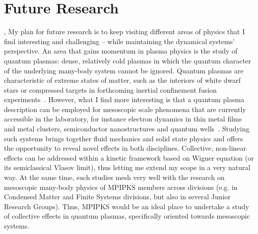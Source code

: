 \documentclass[11pt,a4paper,final]{moderncv}
\begin{document}
\section{Future Research}
\sep
{}
My plan for future research is to keep visiting different areas of
physics that I find interesting and challenging -- while maintaining 
the dynamical systems' perspective. An area that gains momentum
in plasma physics is the study of quantum plasmas: dense, relatively cold
plasmas in which the quantum 
character of the underlying many-body system cannot be ignored. Quantum
plasmas are characteristic of extreme states of matter, such as the interiors
of white dwarf stars or compressed targets 
in forthcoming inertial confinement fusion experiments~\cite{shukla_spin_2009}. 
However, what I find
more interesting is that a quantum plasma description can be employed for
mesoscopic scale phenomena that are currently accessible in the laboratory, 
for instance electron dynamics in thin metal films and metal clusters, semiconductor 
nanostructures and quantum wells~\cite{manfredi05}. Studying such systems 
brings together fluid mechanics and solid state physics and offers the
opportunity to reveal novel effects in both disciplines. 
Collective, non-linear effects can be
addressed within a kinetic framework based on Wigner equation 
(or its semiclassical Vlasov limit), thus letting me extend my scope in a very
natural way. At the same time, such studies mesh very well with the research 
on mesoscopic many-body physics of MPIPKS members across divisions 
(e.g. in Condensed Matter and Finite Systems divisions, but also in 
several Junior Research Groups). Thus, MPIPKS would be an ideal place 
to undertake a study of collective effects in quantum plasmas, specifically
oriented towards mesoscopic systems.
\\ \\ \\ 
\end{document}
